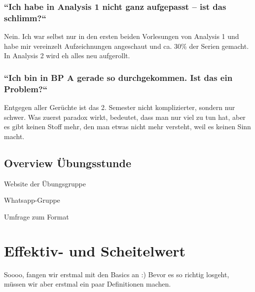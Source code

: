 \documentclass[11pt,a4paper]{article}
\begin{document}
\subsubsection{``Ich habe in Analysis 1 nicht ganz aufgepasst – ist das schlimm{?}``}
Nein. Ich war selbst nur in den ersten beiden Vorlesungen von Analysis 1 und habe mir vereinzelt Aufzeichnungen angeschaut und ca. 30\% der Serien gemacht. In Analysis 2 wird eh alles neu aufgerollt.

\subsubsection{``Ich bin in BP A gerade so durchgekommen. Ist das ein Problem?``}
Entgegen aller Gerüchte ist das 2. Semester nicht komplizierter, sondern nur schwer. Was zuerst paradox wirkt, bedeutet, dass man nur viel zu tun hat, aber es gibt keinen Stoff mehr, den man etwas nicht mehr versteht, weil es keinen Sinn macht.

\subsection{Overview Übungsstunde}
\centering

\begin{minipage}{0.8\linewidth}
    Website der Übungsgruppe
    \hfill  
\end{minipage}

\vfill %
\begin{minipage}{0.8\linewidth}  
    Whatsapp-Gruppe
    \hfill  
\end{minipage}
\vfill
\begin{minipage}{0.8\linewidth}
    Umfrage zum Format
    \hfill  
\end{minipage}

\raggedright
\newpage
\raggedright
\section{Effektiv- und Scheitelwert}
Soooo, fangen wir erstmal mit den Basics an :) Bevor es so richtig losgeht, müssen wir aber erstmal ein paar Definitionen machen.
\end{document}
